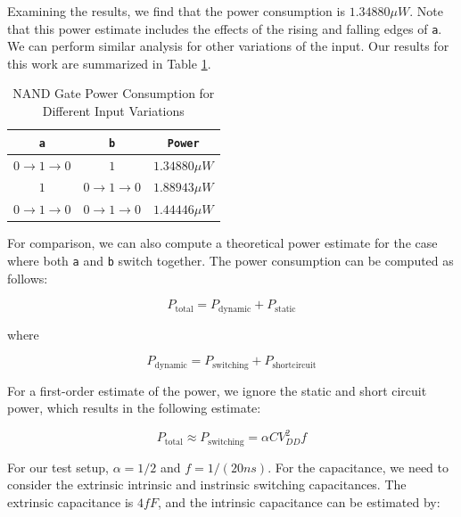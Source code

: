 \documentclass{article}
\begin{document}
	\noindent Examining the results, we find that the power consumption is $1.34880{\mu}W$. Note that this power estimate includes the effects of the rising and falling edges of \texttt{a}. We can perform similar analysis for other variations of the input. Our results for this work are summarized in Table \ref{table::nand_gate_power_analysis}.
	
	\begin{table}[H]
	\begin{center}
	\caption{NAND Gate Power Consumption for Different Input Variations}
	\label{table::nand_gate_power_analysis}
	\begin{tabular}{| c | c | c |}
		\hline
		\texttt{a} & \texttt{b} & \texttt{Power}\\
		\hline	
		$0 \rightarrow 1 \rightarrow 0$ & $1$ & $1.34880{\mu}W$ \\
		\hline	
		$1$ & $0 \rightarrow 1 \rightarrow 0$ & $1.88943{\mu}W$ \\
		\hline	
		$0 \rightarrow 1 \rightarrow 0$ & $0 \rightarrow 1 \rightarrow 0$ & $1.44446{\mu}W$\\
		\hline
	\end{tabular}
	\end{center}
	\end{table}
	
	For comparison, we can also compute a theoretical power estimate for the case where both \texttt{a} and \texttt{b} switch together. The power consumption can be computed as follows:
	
	\begin{equation}
		P_{\text{total}} = P_{\text{dynamic}} + P_{\text{static}}
	\end{equation}
	
	\noindent where
	
	\begin{equation}
		P_{\text{dynamic}} = P_{\text{switching}} +  P_{\text{shortcircuit}}
	\end{equation}
	
	\noindent For a first-order estimate of the power, we ignore the static and short circuit power, which results in the following estimate:
	
	\begin{equation}
		P_{\text{total}} \approx P_{\text{switching}} = \alpha CV_{DD}^2f
	\end{equation}
	
	\noindent For our test setup, $\alpha = 1/2$ and $f = 1/(20 ns)$. For the capacitance, we need to consider the extrinsic intrinsic and instrinsic switching capacitances. The extrinsic capacitance is $4 fF$, and the intrinsic capacitance can be estimated by:
	
\end{document}
